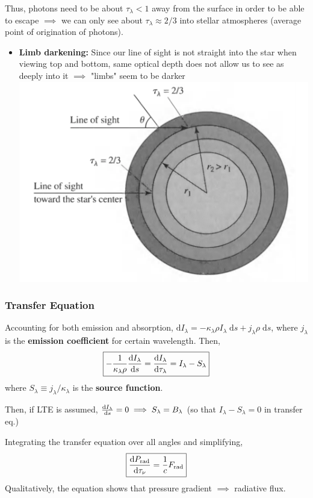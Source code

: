 \documentclass[12pt]{article}
\renewcommand{\dd}{\mathrm{d}}
\begin{document}
Thus, photons need to be about $\tau_\lambda < 1$ away from the surface in order to be able to escape $\implies$ we can only see about $\tau_\lambda \approx 2/3$ into stellar atmospheres (average point of origination of photons).
\begin{itemize}
    \item \textbf{Limb darkening:} Since our line of sight is not straight into the star when viewing top and bottom, same optical depth does not allow us to see as deeply into it $\implies$ "limbs" seem to be darker
    \includegraphics[scale=0.5]{Figures/LimbDarkening.png}
 \end{itemize}

\subsubsection{Transfer Equation}

Accounting for both emission and absorption, $\dd I_\lambda = -\kappa_\lambda\rho I_\lambda\;\dd s + j_\lambda\rho\;\dd s$, where $j_\lambda$ is the \textbf{emission coefficient} for certain wavelength. Then, $$\boxed{-\dfrac{1}{\kappa_\lambda\rho}\dv{I_\lambda}{s} = \dv{I_\lambda}{\tau_\lambda} = I_\lambda - S_\lambda}$$ where $S_\lambda \equiv j_\lambda/\kappa_\lambda$ is the \textbf{source function}.

Then, if LTE is assumed, $\dv{I_\lambda}{s} = 0 \implies S_\lambda = B_\lambda$ (so that $I_\lambda - S_\lambda = 0$ in transfer eq.)

Integrating the transfer equation over all angles and simplifying, $$\boxed{\dv{P_\text{rad}}{\tau_\nu} = \frac{1}{c}F_\text{rad}}$$ Qualitatively, the equation shows that pressure gradient $\implies$ radiative flux.
\end{document}
